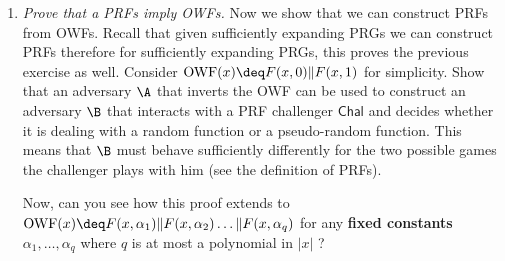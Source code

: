 \documentclass[A4, 11pt]{article}
\newcommand{\Chal}{\ensuremath{\mathsf{Chal}}}
\begin{document}
\begin{enumerate}
\item {\it Prove that a PRFs imply OWFs.} Now we show that we can construct
PRFs from OWFs. Recall that given sufficiently expanding PRGs we can
construct PRFs therefore for sufficiently expanding PRGs, this proves the
previous exercise as well. Consider ${\rm OWF}(x) \deq F(x,0) \| F(x,1)$
for simplicity.  Show that an adversary $\A$ that inverts the OWF can be
used to construct an adversary $\B$ that interacts with a PRF challenger
$\Chal$ and decides whether it is dealing with a random function or a
pseudo-random function.  This means that $\B$ must behave sufficiently
differently for the two possible games the challenger plays with him (see
the definition of PRFs).

Now, can you see how this proof extends to ${\rm OWF}(x) \deq F(x,\alpha_1)
\| F(x, \alpha_2) \ldots \| F(x,\alpha_q)$ for any {\bf fixed constants}
$\alpha_1, \ldots, \alpha_q$ where $q$ is at most a polynomial in $|x|$ ?

\end{enumerate}
\end{document}
